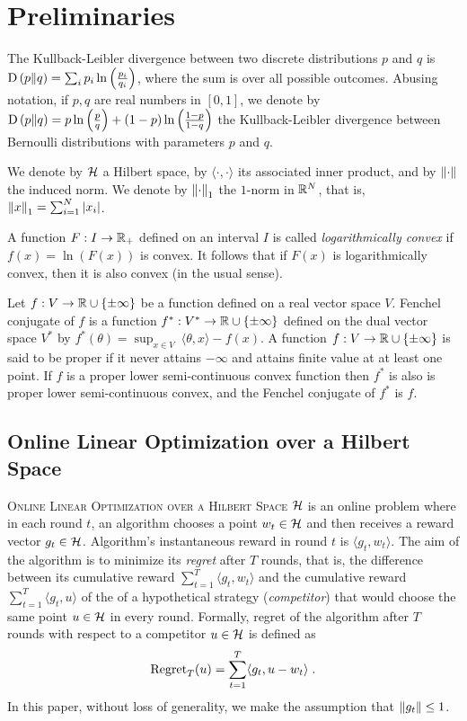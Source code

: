 \section{Preliminaries}

The Kullback-Leibler divergence between two discrete
distributions $p$ and $q$ is $\operatorname*{D}\left({p}\middle\|{q}\right) = \sum_{i} p_i \ln\left( \frac{p_i}{q_i} \right)$,
where the sum is over all possible outcomes. Abusing notation, if $p,q$ are real
numbers in $[0,1]$, we denote by
$\operatorname*{D}\left({p}\middle\|{q}\right) = p \ln \left(\frac{p}{q} \right) + (1-p) \ln \left(\frac{1-p}{1-q} \right)$
the Kullback-Leibler divergence between Bernoulli distributions with parameters
$p$ and $q$.

We denote by $\mathcal{H}$ a Hilbert space, by $\langle \cdot, \cdot\rangle$ its
associated inner product, and by $\left\|{\cdot}\right\|$ the induced norm.
We denote by $\left\|{\cdot}\right\|_1$ the $1$-norm in $\mathbb{R}^N$, that is,
$\left\|{x}\right\|_1 = \sum_{i=1}^N |x_i|$.

A function $F:I \to \mathbb{R}_+$ defined on an interval $I$ is called
\emph{logarithmically convex} if $f(x) = \ln(F(x))$ is convex. It follows that if
$F(x)$ is logarithmically convex, then it is also convex (in the usual sense).

Let $f:V \to \mathbb{R} \cup \{\pm\infty\}$ be a function defined on a real vector space
$V$. Fenchel conjugate of $f$ is a function $f^*:V^* \to \mathbb{R} \cup \{\pm \infty\}$
defined on the dual vector space $V^*$ by
$f^*(\theta) = \sup_{x \in V} \ \langle \theta, x \rangle - f(x)$.
A function $f:V \to \mathbb{R} \cup \{\pm \infty\}$ is said to be proper if it never
attains $-\infty$ and attains finite value at at least one point. If $f$ is a
proper lower semi-continuous convex function then $f^*$ is also is proper lower
semi-continuous convex, and the Fenchel conjugate of $f^*$ is $f$.

\subsection{Online Linear Optimization over a Hilbert Space}

\textsc{Online Linear Optimization over a Hilbert Space $\mathcal{H}$} is an online
problem where in each round $t$, an algorithm chooses a point $w_t \in \mathcal{H}$ and
then receives a reward vector $g_t \in \mathcal{H}$. Algorithm's instantaneous reward in
round $t$ is $\langle g_t, w_t \rangle$. The aim of the algorithm is to minimize
its \emph{regret} after $T$ rounds, that is, the difference between its
cumulative reward $\sum_{t=1}^T \langle g_t, w_t \rangle$ and the cumulative
reward $\sum_{t=1}^T \langle g_t, u \rangle$ of the of a hypothetical strategy
(\emph{competitor}) that would choose the same point $u \in \mathcal{H}$ in every round.
Formally, regret of the algorithm after $T$ rounds with respect to a competitor
$u \in \mathcal{H}$ is defined as
\begin{equation}
\label{equation:regret-definition}
\operatorname{Regret}_T(u) = \sum_{t=1}^T \langle g_t , u - w_t \rangle \; .
\end{equation}
In this paper, without loss of generality, we make the assumption that $\left\|{g_t}\right\| \le 1$.


